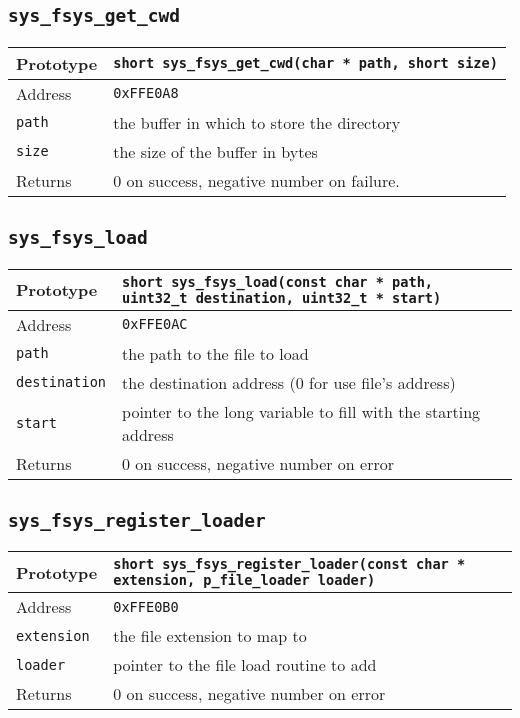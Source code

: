 \subsection*{\texttt{sys\_fsys\_get\_cwd}}
\begin{tabular}{|l||l|} \hline
Prototype & \lstinline!short sys_fsys_get_cwd(char * path, short size)! \\ \hline
Address & \texttt{0xFFE0A8} \\ \hline
\lstinline!path! & the buffer in which to store the directory \\ \hline
\lstinline!size! & the size of the buffer in bytes \\ \hline
Returns & 0 on success, negative number on failure. \\ \hline
\end{tabular}

\subsection*{\texttt{sys\_fsys\_load}}
\begin{tabular}{|l||l|} \hline
Prototype & \lstinline!short sys_fsys_load(const char * path, uint32_t destination, uint32_t * start)! \\ \hline
Address & \texttt{0xFFE0AC} \\ \hline
\lstinline!path! & the path to the file to load \\ \hline
\lstinline!destination! & the destination address (0 for use file's address) \\ \hline
\lstinline!start! & pointer to the long variable to fill with the starting address \\ \hline
Returns & 0 on success, negative number on error \\ \hline
\end{tabular}

\subsection*{\texttt{sys\_fsys\_register\_loader}}
\begin{tabular}{|l||l|} \hline
Prototype & \lstinline!short sys_fsys_register_loader(const char * extension, p_file_loader loader)! \\ \hline
Address & \texttt{0xFFE0B0} \\ \hline
\lstinline!extension! & the file extension to map to \\ \hline
\lstinline!loader! & pointer to the file load routine to add \\ \hline
Returns & 0 on success, negative number on error \\ \hline
\end{tabular}

